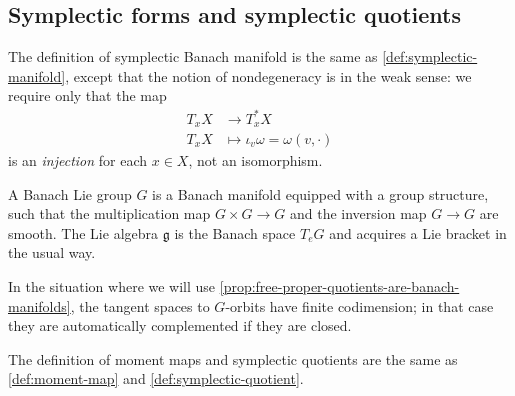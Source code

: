 \documentclass[12pt,letterpaper,reqno]{article}
\numberwithin{equation}{section}
\newcommand{\fg}{{\mathfrak g}}
\newcommand{\ti}[1]{\textit{#1}}
\newcommand{\fixme}[1]{{\color{orange}{[#1]}}}
\begin{document}
\subsection{Symplectic forms and symplectic quotients}

\begin{defn}
The definition of symplectic Banach manifold is the same as
\autoref{def:symplectic-manifold}, except that the notion
of nondegeneracy is in the weak sense: we require only that
the map
\begin{align}
  T_x X &\to T^*_x X \\
  T_x X &\mapsto \iota_v \omega = \omega(v,\cdot)
\end{align}
is an \ti{injection} for each $x \in X$,
not an isomorphism.
\end{defn}


\begin{defn}
A Banach Lie group $G$ is a
Banach manifold equipped with a group structure,
such that the multiplication map $G \times G \to G$ and the 
inversion map $G \to G$
are smooth. The Lie algebra $\fg$ is the Banach space
$T_e G$ and acquires a Lie bracket in the usual way.
\end{defn}



In the situation where we will use
\autoref{prop:free-proper-quotients-are-banach-manifolds}, the
tangent spaces to $G$-orbits have finite codimension; in that
case they are automatically complemented if they are closed.

\begin{defn} \label{def:banach-mm-and-sq}
The definition of moment maps and symplectic quotients are the same
as \autoref{def:moment-map} and \autoref{def:symplectic-quotient}.
\end{defn}
\end{document}
